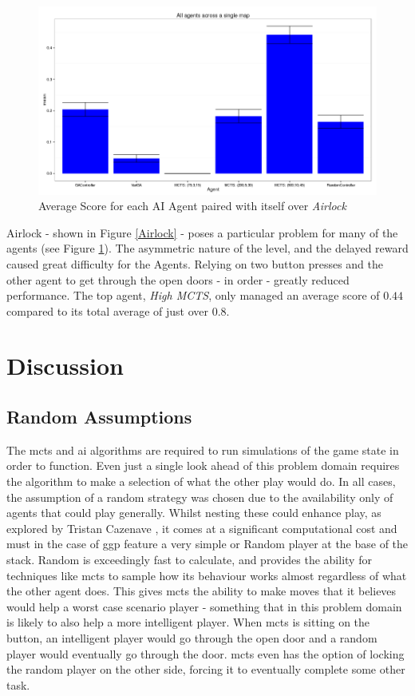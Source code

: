 \documentclass{IEEEtran}
\begin{document}
\begin{figure}[!ht]
\centering
\includegraphics[width = \linewidth]{level5-txt-scores}
\caption{Average Score for each AI Agent paired with itself over \emph{Airlock}}
\label{avgScoreMap5}
\end{figure}

Airlock - shown in Figure \ref{Airlock} - poses a particular problem for many of the agents (see Figure \ref{avgScoreMap5}). The asymmetric nature of the level, and the delayed reward caused great difficulty for the Agents. Relying on two button presses and the other agent to get through the open doors - in order - greatly reduced performance. The top agent, \emph{High MCTS}, only managed an average score of $0.44$ compared to its total average of just over $0.8$.

\section{Discussion}
\subsection{Random Assumptions}
The \gls{mcts} and \gls{ai} algorithms are required to run simulations of the game state in order to function. Even just a single look ahead of this problem domain requires the algorithm to make a selection of what the other play would do. In all cases, the assumption of a random strategy was chosen due to the availability only of agents that could play generally. Whilst nesting these could enhance play, as explored by Tristan Cazenave \cite{cazenave2007reflexive}, it comes at a significant computational cost and must in the case of \gls{ggp} feature a very simple or Random player at the base of the stack. Random is exceedingly fast to calculate, and provides the ability for techniques like \gls{mcts} to sample how its behaviour works almost regardless of what the other agent does. This gives \gls{mcts} the ability to make moves that it believes would help a worst case scenario player - something that in this problem domain is likely to also help a more intelligent player. When \gls{mcts} is sitting on the button, an intelligent player would go through the open door and a random player would eventually go through the door. \gls{mcts} even has the option of locking the random player on the other side, forcing it to eventually complete some other task.
\end{document}
